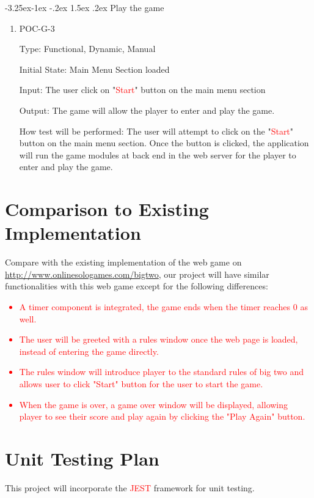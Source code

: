 \documentclass[12pt, titlepage]{article}
\makeatletter
\renewcommand\paragraph{\@startsection{paragraph}{4}{\z@}%
                                     {-3.25ex\@plus -1ex \@minus -.2ex}%
                                     {1.5ex \@plus .2ex}%
                                     {\normalfont\normalsize\bfseries}}
\makeatother
\begin{document}
\paragraph{Play the game}

\begin{enumerate}

\item{POC-G-3\\}

Type: Functional, Dynamic, Manual
					
Initial State: Main Menu Section loaded
					
Input: The user click on "\textcolor{red}{Start}" button on the main menu section 
					
Output: The game will allow the player to enter and play the game.
					
How test will be performed: The user will attempt to click on the "\textcolor{red}{Start}" button on the main menu section. Once the button is clicked, the application will run the game modules at back end in the web server for the player to enter and play the game.

\end{enumerate}
	
\section{Comparison to Existing Implementation}	
Compare with the existing implementation of the web game on \url{http://www.onlinesologames.com/bigtwo}, our project will have similar functionalities with this web game except for the following differences:
\textcolor{red}{
\begin{itemize}
    \item A timer component is integrated, the game ends when the timer reaches 0 as well.
    \item The user will be greeted with a rules window once the web page is loaded, instead of entering the game directly.
    \item The rules window will introduce player to the standard rules of big two and allows user to click "Start" button for the user to start the game.
    \item When the game is over, a game over window will be displayed, allowing player to see their score and play again by clicking the "Play Again" button.
\end{itemize}
}

				
\section{Unit Testing Plan}
This project will incorporate the \textcolor{red}{JEST} framework for unit testing.
\end{document}

